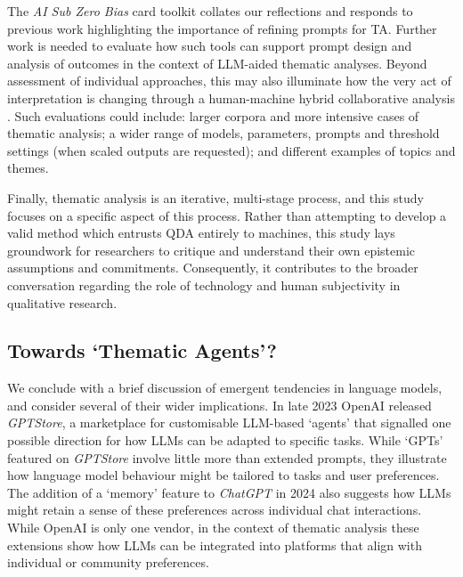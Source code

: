 \documentclass{article}
\begin{document}
The \emph{AI Sub Zero Bias} card toolkit collates our reflections and responds to previous work highlighting the importance of refining prompts for TA. Further work is needed to evaluate how such tools can support prompt design and analysis of outcomes in the context of LLM-aided thematic analyses. Beyond assessment of individual approaches, this may also illuminate how the very act of interpretation is changing through a human-machine hybrid collaborative analysis \cite{depaoliPerformingInductiveThematic2023, gaoCollabCoderLowerbarrierRigorous2024, jiangSupportingSerendipityOpportunities2021}. Such evaluations could include: larger corpora and more intensive cases of thematic analysis; a wider range of models, parameters, prompts and threshold settings (when scaled outputs are requested); and different examples of topics and themes. 

Finally, thematic analysis is an iterative, multi-stage process, and this study focuses on a specific aspect of this process. Rather than attempting to develop a valid method which entrusts QDA entirely to machines, this study lays groundwork for researchers to critique and understand their own epistemic assumptions and commitments. Consequently, it contributes to the broader conversation regarding the role of technology and human subjectivity in qualitative research.


\subsection{\texorpdfstring{Towards `Thematic Agents'?}{Towards `Thematic Agents'?}}\label{towards-gpt-agents}

We conclude with a brief discussion of emergent tendencies in language models, and consider several of their wider implications. In late 2023 OpenAI released \emph{GPTStore}, a marketplace for customisable LLM-based `agents' \cite{logankilpatrickGPTBuilder2024, natalieCreatingGPTOpenAI2024} that signalled one possible direction for how LLMs can be adapted to specific tasks. While `GPTs' featured on \emph{GPTStore} involve little more than extended prompts, they illustrate how language model behaviour might be tailored to tasks and user preferences. The addition of a `memory' feature to \emph{ChatGPT} in 2024 also suggests how LLMs might retain a sense of these preferences across individual chat interactions. While OpenAI is only one vendor, in the context of thematic analysis these extensions show how LLMs can be integrated into platforms that align with individual or community preferences. 
\end{document}
